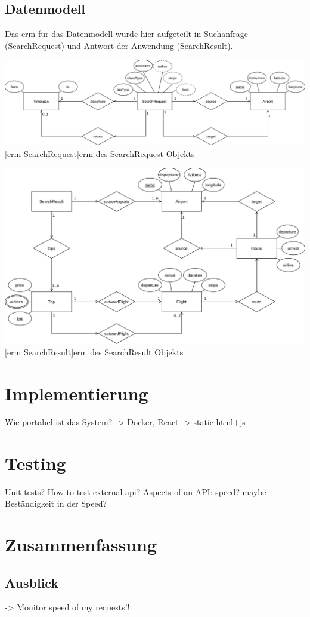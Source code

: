 \documentclass[12pt,twoside,a4paper]{article}
\begin{document}
\subsection{Datenmodell}
Das \acrlong{erm} für das Datenmodell wurde hier aufgeteilt in Suchanfrage (SearchRequest) und Antwort der Anwendung (SearchResult).
\begin{center}
	\captionsetup{type=figure}
	\includegraphics[width=\textwidth]{images/datamodel-SearchRequest}
	[\acrshort{erm} SearchRequest]{\acrlong{erm} des SearchRequest Objekts}
\end{center}
\begin{center}
	\captionsetup{type=figure}
	\includegraphics[width=\textwidth]{images/datamodel-SearchResult}
	[\acrshort{erm} SearchResult]{\acrlong{erm} des SearchResult Objekts}
\end{center}
\section{Implementierung}
Wie portabel ist das System? -> Docker, React -> static html+js
\section{Testing}
Unit tests?
How to test external api?
Aspects of an API: speed? maybe Beständigkeit in der Speed?
\section{Zusammenfassung}
\subsection{Ausblick}
-> Monitor speed of my requests!!
\newpage


\end{document}
